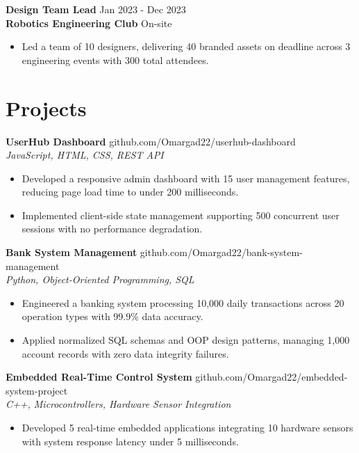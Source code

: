 \documentclass[letterpaper,10pt]{article}
\begin{document}
\vspace{5pt}
\textbf{Design Team Lead} \hfill Jan 2023 - Dec 2023\\
\textbf{Robotics Engineering Club} \hfill On-site
\begin{itemize}
  \item Led a team of 10 designers, delivering 40 branded assets on deadline across 3 engineering events with 300 total attendees.
\end{itemize}

\section{Projects}

\textbf{UserHub Dashboard} \hfill github.com/Omargad22/userhub-dashboard\\
\textit{JavaScript, HTML, CSS, REST API}
\begin{itemize}
  \item Developed a responsive admin dashboard with 15 user management features, reducing page load time to under 200 milliseconds.
  \item Implemented client-side state management supporting 500 concurrent user sessions with no performance degradation.
\end{itemize}

\vspace{5pt}
\textbf{Bank System Management} \hfill github.com/Omargad22/bank-system-management\\
\textit{Python, Object-Oriented Programming, SQL}
\begin{itemize}
  \item Engineered a banking system processing 10,000 daily transactions across 20 operation types with 99.9\% data accuracy.
  \item Applied normalized SQL schemas and OOP design patterns, managing 1,000 account records with zero data integrity failures.
\end{itemize}

\vspace{5pt}
\textbf{Embedded Real-Time Control System} \hfill github.com/Omargad22/embedded-system-project\\
\textit{C++, Microcontrollers, Hardware Sensor Integration}
\begin{itemize}
  \item Developed 5 real-time embedded applications integrating 10 hardware sensors with system response latency under 5 milliseconds.
\end{itemize}
\end{document}
